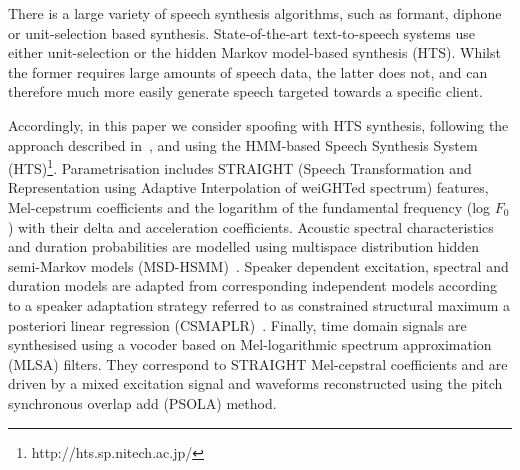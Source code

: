 There is a large variety of speech synthesis algorithms, such as formant, diphone or unit-selection based synthesis. State-of-the-art text-to-speech systems use either unit-selection or the hidden Markov model-based synthesis (HTS). Whilst the former requires large amounts of speech data, the latter does not, and can therefore much more easily generate speech targeted towards a specific client. 

Accordingly, in this paper we consider spoofing with HTS synthesis, following the approach described in~\cite{Yamagishi2009}, and using the HMM-based Speech Synthesis System (HTS)\footnote{http://hts.sp.nitech.ac.jp/}. Parametrisation includes STRAIGHT (Speech Transformation and Representation using Adaptive Interpolation of weiGHTed spectrum) features, Mel-cepstrum coefficients and the logarithm of the fundamental frequency (log $F_{0}$) with their delta and acceleration coefficients. Acoustic spectral characteristics and duration probabilities are modelled using multispace distribution hidden semi-Markov models (MSD-HSMM)~\cite{Russell1985}.  Speaker dependent  excitation, spectral and duration models are adapted from corresponding independent models according to a speaker adaptation strategy referred to as constrained structural maximum a posteriori linear regression (CSMAPLR)~\cite{Yamagishi2009a}.  Finally, time domain signals are synthesised using a vocoder based on Mel-logarithmic spectrum approximation (MLSA) filters.  They correspond to STRAIGHT Mel-cepstral coefficients and are driven by a mixed excitation signal and waveforms reconstructed using the pitch synchronous overlap add (PSOLA) method.


